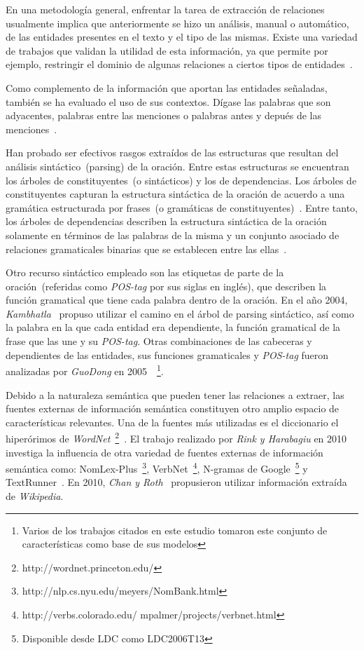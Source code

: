 En una metodología general, enfrentar la tarea de extracción de relaciones usualmente implica que anteriormente se hizo un análisis, manual o automático, de las entidades presentes en el texto y el tipo de las mismas. 
Existe una variedad de trabajos que validan la utilidad de esta información, ya que permite por ejemplo, restringir el dominio de algunas relaciones a ciertos tipos de entidades~\cite{kambhatla2004combining, boschee2005automatic, guodong2005exploring, jiang2007systematic, chan2010exploiting}.

Como complemento de la información que aportan las entidades señaladas, también se ha evaluado el uso de sus contextos.
Dígase las palabras que son adyacentes, palabras entre las menciones o palabras antes y depués de las menciones~\cite{guodong2005exploring, chan2010exploiting, sun2011semi, nguyen2014employing}.

Han probado ser efectivos rasgos extraídos de las estructuras que resultan del análisis sintáctico~(parsing) de la oración.
Entre estas estructuras se encuentran los árboles de constituyentes~(o sintácticos) y los de dependencias.
Los árboles de constituyentes capturan la estructura sintáctica de la oración de acuerdo a una gramática estructurada por frases~(o gramáticas de constituyentes)~\cite{chomsky2002syntactic}.
Entre tanto, los árboles de dependencias describen la estructura sintáctica de la oración solamente en términos de las palabras de la misma y un conjunto asociado de relaciones gramaticales binarias que se establecen entre las ellas~\cite{tesniere2015elements}.

Otro recurso sintáctico empleado son las etiquetas de parte de la oración~(referidas como \textit{POS-tag} por sus siglas en inglés), que describen la función gramatical que tiene cada palabra dentro de la oración.
En el año 2004, \textit{Kambhatla}~\cite{kambhatla2004combining} propuso utilizar el camino en el árbol de parsing sintáctico, así como la palabra en la que cada entidad era dependiente, la función gramatical de la frase que las une y su \textit{POS-tag}.
Otras combinaciones de las cabeceras y dependientes de las entidades, sus funciones gramaticales y \textit{POS-tag} fueron analizadas por \textit{GuoDong} en 2005~\cite{guodong2005exploring}~\footnote{Varios de los trabajos citados en este estudio tomaron este conjunto de características como base de sus modelos}.

Debido a la naturaleza semántica que pueden tener las relaciones a extraer, las fuentes externas de información semántica constituyen otro amplio espacio de características relevantes.
Una de la fuentes más utilizadas es el diccionario el hiperórimos de \textit{WordNet}~\footnote{http://wordnet.princeton.edu/}~\cite{guodong2005exploring, rink2010utd}.
El trabajo realizado por \textit{Rink y Harabagiu} en 2010~\cite{rink2010utd} investiga la influencia de otra variedad de fuentes externas de información semántica como: NomLex-Plus~\footnote{http://nlp.cs.nyu.edu/meyers/NomBank.html}, VerbNet~\footnote{http://verbs.colorado.edu/ mpalmer/projects/verbnet.html}, N-gramas de Google~\footnote{Disponible desde LDC como LDC2006T13} y TextRunner~\cite{yates2007textrunner}.
En 2010, \textit{Chan y Roth}~\cite{chan2010exploiting} propusieron utilizar información extraída de \textit{Wikipedia}.

